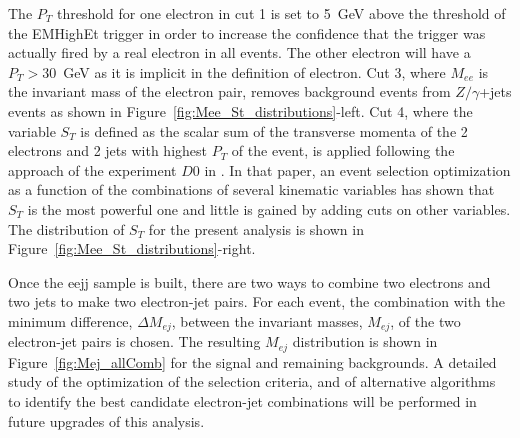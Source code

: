\documentclass{cmspaper}
\begin{document}
\begin{linenumbers}
The $P_T$ threshold for one electron in cut 1 is set to 5~GeV above the threshold of the EMHighEt trigger 
in order to increase the confidence that the trigger was actually fired by a real electron in all events.
The other electron will have a $P_T>30$~GeV as it is implicit in the definition of electron. 
Cut 3, where $M_{ee}$ is the invariant mass of the electron pair, removes background events from 
$Z/\gamma$+jets events as shown in Figure~\ref{fig:Mee_St_distributions}-left.
Cut 4, where the variable $S_T$ is defined as the scalar sum of the transverse momenta of the 
2 electrons and 2 jets with highest $P_{T}$ of the event, 
is applied following the approach of the experiment $D0$ in 
\cite{Abazov:2001mx}. In that paper, an event selection optimization as a function of
the combinations of several kinematic variables has shown that $S_T$ is the most powerful one 
and little is gained by adding cuts on other variables. The distribution of $S_T$ for the present
analysis is shown in Figure~\ref{fig:Mee_St_distributions}-right.


Once the eejj sample is built, there are two ways to combine two electrons and two jets to make two electron-jet pairs. 
For each event, the combination with the minimum difference, $\Delta M_{ej}$, between the invariant masses, $M_{ej}$, 
of the two electron-jet pairs is chosen. 
The resulting $M_{ej}$ distribution is shown in Figure~\ref{fig:Mej_allComb} for the signal and remaining backgrounds. 
A detailed study of the optimization of the selection criteria, and of alternative algorithms to identify the best candidate 
electron-jet combinations will be performed in future upgrades of this analysis.


\end{linenumbers}
\end{document}
